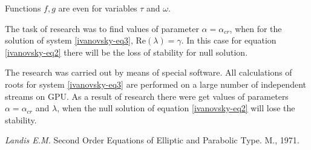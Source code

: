 \documentclass{article}
\begin{document}
Functions  $ f, g $ are even for variables $ \tau $ and $ \omega $.

The task of research was to find values of parameter $ \alpha = \alpha_{cr} $, when for the solution of system \eqref{ivanovsky-eq3}, $ \mbox{Re}(\lambda)  = \gamma $. In this case for equation \eqref{ivanovsky-eq2} there will be the loss of stability for null solution.

The research was carried out by means of special software. All calculations of roots for system \eqref{ivanovsky-eq3} are performed on a large number of independent streams on GPU. As a result of research there were get values of parameters $ \alpha = \alpha_{cr} $ and $ \lambda $, when the null solution of equation \eqref{ivanovsky-eq2} will lose the stability.

\begin{thebibliography}{99}

\textit{ Landis E.M. } 
{ Second Order Equations of Elliptic and Parabolic Type. M., 1971. } 

\end{thebibliography}
\end{document}
